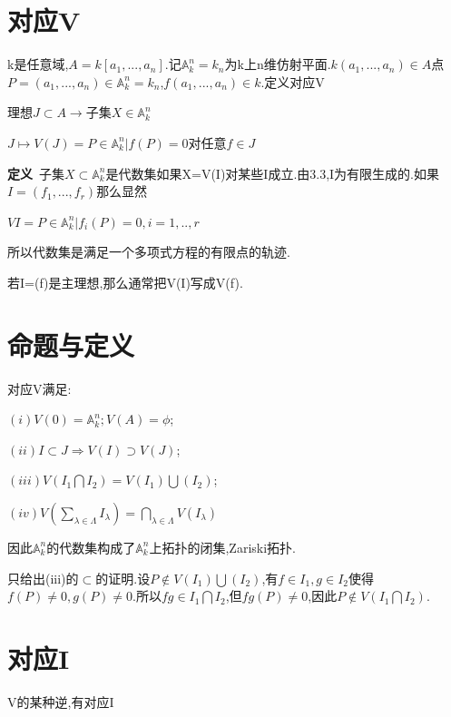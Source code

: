 \documentclass[UTF8]{book}
\begin{document}
		
	\section{对应V}
		k是任意域,$A=k[a_{1},...,a_{n}]$.记$\mathbb{A}^{n}_{k}=k_{n}$为k上n维仿射平面.$k(a_{1},...,a_{n})\in A$点$P=(a_{1},...,a_{n}) \in \mathbb{A}^{n}_{k}=k_{n}$,$f(a_{1},...,a_{n}) \in k$.定义对应V
		
		
		\begin{center}
			${理想J \subset A} \longrightarrow {子集X \in \mathbb{A}^{n}_{k}}$
			
			
			$J \longmapsto V(J)={P \in \mathbb{A}^{n}_{k}|f(P)=0对任意f \in J}$
		\end{center}
		
		
		\textbf{定义}\ 子集$X \subset \mathbb{A}^{n}_{k}$是代数集如果X=V(I)对某些I成立.由3.3,I为有限生成的.如果$I=(f_{1},...,f_{r})$那么显然
		
		
		\begin{center}
			$V{I}={P \in \mathbb{A}^{n}_{k}|f_{i}(P)=0,i=1,..,r}$
		\end{center}
		
		
		所以代数集是满足一个多项式方程的有限点的轨迹.
		
		
		若I=(f)是主理想,那么通常把V(I)写成V(f).
		
		
	\section{命题与定义}
		对应V满足:
		
		
		$(i)V(0)=\mathbb{A}^{n}_{k};V(A)=\phi$;
		
		
		$(ii)I \subset J \Rightarrow V(I)\supset V(J)$;
		
		
		$(iii)V(I_{1} \bigcap I_{2}) = V(I_{1}) \bigcup (I_{2})$;
		
		
		$(iv)V(\sum _{\lambda \in \Lambda}I_{\lambda})=\bigcap _{\lambda \in \Lambda}V(I_{\lambda})$
		
		
		因此$\mathbb{A}^{n}_{k}$的代数集构成了$\mathbb{A}^{n}_{k}$上拓扑的闭集,Zariski拓扑.
		
		
		只给出(iii)的$\subset$的证明.设$P\notin V(I_{1}) \bigcup (I_{2})$,有$f\in I_{1},g\in I_{2}$使得$f(P) \ne 0,g(P) \ne 0$.所以$fg\in I_{1} \bigcap I_{2}$,但$fg(P) \ne 0$,因此$P\notin V(I_{1} \bigcap I_{2})$.
		
		
	\section{对应I}
		V的某种逆,有对应I
		
\end{document}
